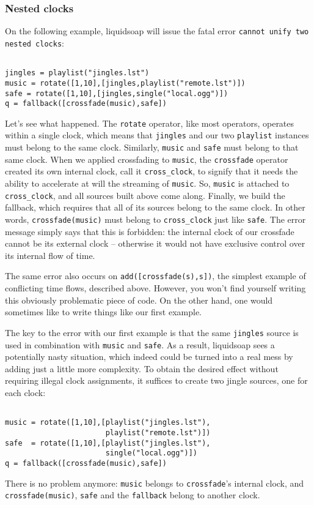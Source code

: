 \subsubsection{Nested clocks}
On the following example, liquidsoap will issue the fatal error
\verb+cannot unify two nested clocks+:

\begin{verbatim}

jingles = playlist("jingles.lst")
music = rotate([1,10],[jingles,playlist("remote.lst")])
safe = rotate([1,10],[jingles,single("local.ogg")])
q = fallback([crossfade(music),safe])
\end{verbatim}
Let's see what happened.
The \verb+rotate+ operator, like most operators, operates
within a single clock, which means that \verb+jingles+
and our two \verb+playlist+ instances must belong to the same clock.
Similarly, \verb+music+ and \verb+safe+ must belong to that
same clock.
When we applied crossfading to \verb+music+,
the \verb+crossfade+ operator created its own internal clock,
call it \verb+cross_clock+,
to signify that it needs the ability to accelerate at will the
streaming of \verb+music+.
So, \verb+music+ is attached to \verb+cross_clock+,
and all sources built above come along.
Finally, we build the fallback, which requires that all of its
sources belong to the same clock.
In other words, \verb+crossfade(music)+ must belong
to \verb+cross_clock+ just like \verb+safe+.
The error message simply says that this is forbidden: the internal
clock of our crossfade cannot be its external clock -- otherwise
it would not have exclusive control over its internal flow of time.

The same error also occurs on \verb+add([crossfade(s),s])+,
the simplest example of conflicting time flows, described above.
However, you won't find yourself writing this obviously problematic
piece of code. On the other hand, one would sometimes like to
write things like our first example.

The key to the error with our first example is that the same
\verb+jingles+ source is used in combination with \verb+music+
and \verb+safe+. As a result, liquidsoap sees a potentially
nasty situation, which indeed could be turned into a real mess
by adding just a little more complexity. To obtain the desired effect
without requiring illegal clock assignments, it suffices to
create two jingle sources, one for each clock:

\begin{verbatim}

music = rotate([1,10],[playlist("jingles.lst"),
                       playlist("remote.lst")])
safe  = rotate([1,10],[playlist("jingles.lst"),
                       single("local.ogg")])
q = fallback([crossfade(music),safe])
\end{verbatim}
There is no problem anymore: \verb+music+ belongs to 
\verb+crossfade+'s internal clock, and \verb+crossfade(music)+,
\verb+safe+ and the \verb+fallback+ belong to another clock.

